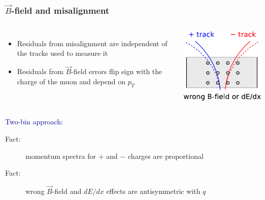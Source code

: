 \documentclass[compress]{beamer}
\begin{document}
\begin{frame}
\frametitle{$\vec{B}$-field and misalignment}

\begin{columns}
\vspace{-0.5 cm}
\begin{itemize}
\item Residuals from misalignment are independent of the tracks used to measure it
\item Residuals from $\vec{B}$-field errors flip sign with the charge
  of the muon and depend on $p_T$
\end{itemize}

\vspace{0.5 cm}
\includegraphics[width=\linewidth]{antisymmetric_bfield.pdf}
\end{columns}

\vspace{-0.2 cm}
\textcolor{darkblue}{\large Two-bin approach:}
\begin{description}
\item[Fact:] momentum spectra for $+$ and $-$ charges are proportional
\item[Fact:] wrong $\vec{B}$-field and $dE/dx$ effects are antisymmetric with $q$
\end{description}


\end{frame}
\end{document}

